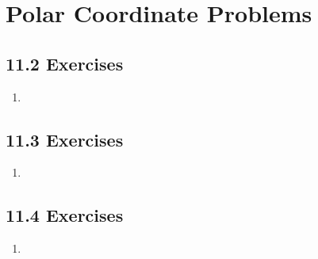 \section{Polar Coordinate Problems}

\subsection{11.2 Exercises}
\begin{enumerate}[itemsep=3em]
  \item
\end{enumerate}

\newpage %

\subsection{11.3 Exercises}
\begin{enumerate}[itemsep=3em]
  \item
\end{enumerate}

\newpage %

\subsection{11.4 Exercises}
\begin{enumerate}[itemsep=3em]
  \item
\end{enumerate}

